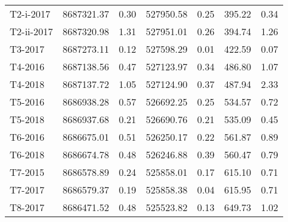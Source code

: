 \begin{tabular}{lrrrrrr}
   T2-i-2017 &    8687321.37 &                0.30 &    527950.58 &               0.25 &         395.22 &                 0.34 \\
  T2-ii-2017 &    8687320.98 &                1.31 &    527951.01 &               0.26 &         394.74 &                 1.26 \\
     T3-2017 &    8687273.11 &                0.12 &    527598.29 &               0.01 &         422.59 &                 0.07 \\
     T4-2016 &    8687138.56 &                0.47 &    527123.97 &               0.34 &         486.80 &                 1.07 \\
     T4-2018 &    8687137.72 &                1.05 &    527124.90 &               0.37 &         487.94 &                 2.33 \\
     T5-2016 &    8686938.28 &                0.57 &    526692.25 &               0.25 &         534.57 &                 0.72 \\
     T5-2018 &    8686937.68 &                0.21 &    526690.76 &               0.21 &         535.09 &                 0.45 \\
     T6-2016 &    8686675.01 &                0.51 &    526250.17 &               0.22 &         561.87 &                 0.89 \\
     T6-2018 &    8686674.78 &                0.48 &    526246.88 &               0.39 &         560.47 &                 0.79 \\
     T7-2015 &    8686578.89 &                0.24 &    525858.01 &               0.17 &         615.10 &                 0.71 \\
     T7-2017 &    8686579.37 &                0.19 &    525858.38 &               0.04 &         615.95 &                 0.71 \\
     T8-2017 &    8686471.52 &                0.48 &    525523.82 &               0.13 &         649.73 &                 1.02 \\
\bottomrule
\end{tabular}
